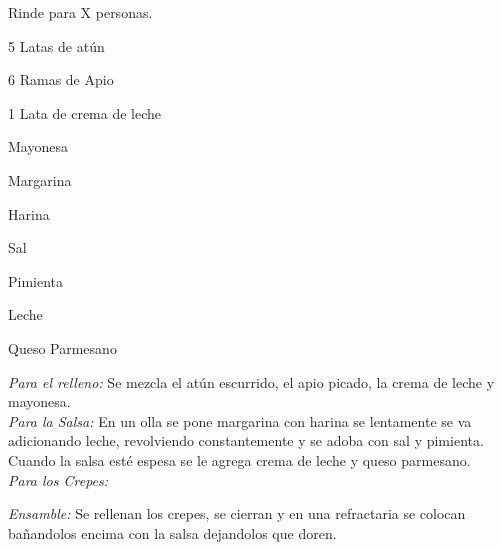 
Rinde para X personas.


\begin{ingredientes}
\item 5 Latas de atún
\item 6 Ramas de Apio
\item 1 Lata de crema de leche
\item Mayonesa
\item Margarina
\item Harina
\item Sal
\item Pimienta
\item Leche
\item Queso Parmesano
\end{ingredientes}
\preparacion
\emph{Para el relleno:} Se mezcla el atún escurrido, el apio picado, la crema de leche y mayonesa.\\

\emph{Para la Salsa:} En un olla se pone margarina con harina se lentamente se va adicionando leche, revolviendo constantemente y se adoba con sal y pimienta. Cuando la salsa esté espesa se le agrega crema de leche y queso parmesano.\\

\emph{Para los Crepes:}

\emph{Ensamble:} Se rellenan los crepes, se cierran y en una refractaria se colocan bañandolos encima con la salsa dejandolos que doren.
